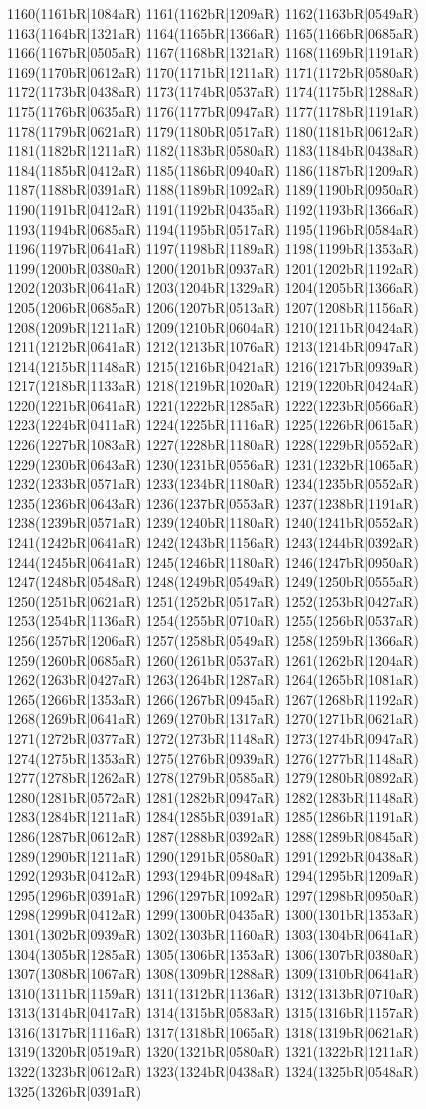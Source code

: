 1160(1161bR|1084aR) 1161(1162bR|1209aR) 1162(1163bR|0549aR) 1163(1164bR|1321aR) 1164(1165bR|1366aR) 1165(1166bR|0685aR) 1166(1167bR|0505aR) 1167(1168bR|1321aR) 1168(1169bR|1191aR) 1169(1170bR|0612aR) 1170(1171bR|1211aR) 1171(1172bR|0580aR) 1172(1173bR|0438aR) 1173(1174bR|0537aR) 1174(1175bR|1288aR) 1175(1176bR|0635aR) 1176(1177bR|0947aR) 1177(1178bR|1191aR) 1178(1179bR|0621aR) 1179(1180bR|0517aR) 1180(1181bR|0612aR) 1181(1182bR|1211aR) 1182(1183bR|0580aR) 1183(1184bR|0438aR) 1184(1185bR|0412aR) 1185(1186bR|0940aR) 1186(1187bR|1209aR) 1187(1188bR|0391aR) 1188(1189bR|1092aR) 1189(1190bR|0950aR) 1190(1191bR|0412aR) 1191(1192bR|0435aR) 1192(1193bR|1366aR) 1193(1194bR|0685aR) 1194(1195bR|0517aR) 1195(1196bR|0584aR) 1196(1197bR|0641aR) 1197(1198bR|1189aR) 1198(1199bR|1353aR) 1199(1200bR|0380aR) 1200(1201bR|0937aR) 1201(1202bR|1192aR) 1202(1203bR|0641aR) 1203(1204bR|1329aR) 1204(1205bR|1366aR) 1205(1206bR|0685aR) 1206(1207bR|0513aR) 1207(1208bR|1156aR) 1208(1209bR|1211aR) 1209(1210bR|0604aR) 1210(1211bR|0424aR) 1211(1212bR|0641aR) 1212(1213bR|1076aR) 1213(1214bR|0947aR) 1214(1215bR|1148aR) 1215(1216bR|0421aR) 1216(1217bR|0939aR) 1217(1218bR|1133aR) 1218(1219bR|1020aR) 1219(1220bR|0424aR) 1220(1221bR|0641aR) 1221(1222bR|1285aR) 1222(1223bR|0566aR) 1223(1224bR|0411aR) 1224(1225bR|1116aR) 1225(1226bR|0615aR) 1226(1227bR|1083aR) 1227(1228bR|1180aR) 1228(1229bR|0552aR) 1229(1230bR|0643aR) 1230(1231bR|0556aR) 1231(1232bR|1065aR) 1232(1233bR|0571aR) 1233(1234bR|1180aR) 1234(1235bR|0552aR) 1235(1236bR|0643aR) 1236(1237bR|0553aR) 1237(1238bR|1191aR) 1238(1239bR|0571aR) 1239(1240bR|1180aR) 1240(1241bR|0552aR) 1241(1242bR|0641aR) 1242(1243bR|1156aR) 1243(1244bR|0392aR) 1244(1245bR|0641aR) 1245(1246bR|1180aR) 1246(1247bR|0950aR) 1247(1248bR|0548aR) 1248(1249bR|0549aR) 1249(1250bR|0555aR) 1250(1251bR|0621aR) 1251(1252bR|0517aR) 1252(1253bR|0427aR) 1253(1254bR|1136aR) 1254(1255bR|0710aR) 1255(1256bR|0537aR) 1256(1257bR|1206aR) 1257(1258bR|0549aR) 1258(1259bR|1366aR) 1259(1260bR|0685aR) 1260(1261bR|0537aR) 1261(1262bR|1204aR) 1262(1263bR|0427aR) 1263(1264bR|1287aR) 1264(1265bR|1081aR) 1265(1266bR|1353aR) 1266(1267bR|0945aR) 1267(1268bR|1192aR) 1268(1269bR|0641aR) 1269(1270bR|1317aR) 1270(1271bR|0621aR) 1271(1272bR|0377aR) 1272(1273bR|1148aR) 1273(1274bR|0947aR) 1274(1275bR|1353aR) 1275(1276bR|0939aR) 1276(1277bR|1148aR) 1277(1278bR|1262aR) 1278(1279bR|0585aR) 1279(1280bR|0892aR) 1280(1281bR|0572aR) 1281(1282bR|0947aR) 1282(1283bR|1148aR) 1283(1284bR|1211aR) 1284(1285bR|0391aR) 1285(1286bR|1191aR) 1286(1287bR|0612aR) 1287(1288bR|0392aR) 1288(1289bR|0845aR) 1289(1290bR|1211aR) 1290(1291bR|0580aR) 1291(1292bR|0438aR) 1292(1293bR|0412aR) 1293(1294bR|0948aR) 1294(1295bR|1209aR) 1295(1296bR|0391aR) 1296(1297bR|1092aR) 1297(1298bR|0950aR) 1298(1299bR|0412aR) 1299(1300bR|0435aR) 1300(1301bR|1353aR) 1301(1302bR|0939aR) 1302(1303bR|1160aR) 1303(1304bR|0641aR) 1304(1305bR|1285aR) 1305(1306bR|1353aR) 1306(1307bR|0380aR) 1307(1308bR|1067aR) 1308(1309bR|1288aR) 1309(1310bR|0641aR) 1310(1311bR|1159aR) 1311(1312bR|1136aR) 1312(1313bR|0710aR) 1313(1314bR|0417aR) 1314(1315bR|0583aR) 1315(1316bR|1157aR) 1316(1317bR|1116aR) 1317(1318bR|1065aR) 1318(1319bR|0621aR) 1319(1320bR|0519aR) 1320(1321bR|0580aR) 1321(1322bR|1211aR) 1322(1323bR|0612aR) 1323(1324bR|0438aR) 1324(1325bR|0548aR) 1325(1326bR|0391aR) 
